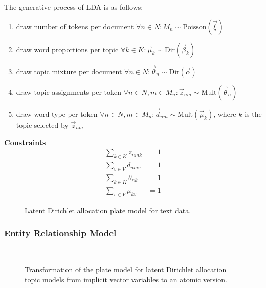 The generative process of LDA is as follows:
\begin{enumerate}
\item draw number of tokens per document $\forall n \in N: M_n \sim \text{Poisson}(\vec \xi)$
\item draw word proportions per topic $\forall k \in K: \vec \mu_k \sim \text{Dir}(\vec \beta_k)$
\item draw topic mixture per document $\forall n \in N: \vec \theta_n \sim \text{Dir}(\vec \alpha)$
\item draw topic assignments per token $\forall n \in N, m \in M_n: \vec z_{nm} \sim \text{Mult}(\vec \theta_n)$
\item draw word type per token $\forall n \in N, m \in M_n: \vec d_{nm} \sim \text{Mult}(\vec \mu_k)$, where $k$ is the topic selected by $\vec z_{nm}$
\end{enumerate}

\textbf{Constraints}
\begin{align}
\sum_{k \in K} z_{nmk} &= 1\\
\sum_{v \in V} d_{nmv} &= 1\\
\sum_{k \in K} \theta_{nk} &= 1\\
\sum_{v \in V} \mu_{kv} &= 1
\end{align}

\begin{figure}[t]
\centering
\scalebox{\tikzScale}{\adjustTikzSize }
\caption{Latent Dirichlet allocation plate model for text data.}\label{fig:topic_platemodel}
\end{figure}

\subsubsection{Entity Relationship Model}

\begin{figure}[t]
\begin{minipage}[t]{0.49\linewidth}
	\begin{center}
	\end{center}
\end{minipage}
\hspace{0.0cm}
\begin{minipage}[t]{0.49\linewidth}
	\begin{center}
	\end{center}
\end{minipage}\\
\caption{Transformation of the plate model for latent Dirichlet allocation topic models from implicit vector variables to an atomic version.}
\label{img:topic_platemodels}
\end{figure}

